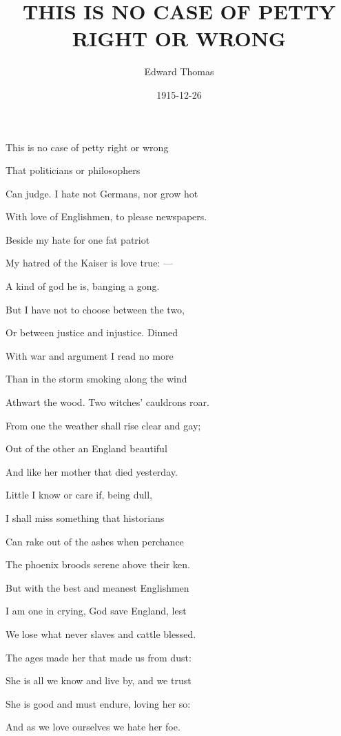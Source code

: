 \documentclass[a4paper]{article}
\title{THIS IS NO CASE OF PETTY RIGHT OR WRONG}
\author{Edward Thomas}
\date{1915-12-26}
\begin{document}
\maketitle


This is no case of petty right or wrong  

That politicians or philosophers 

Can judge.  I hate not Germans, nor grow hot 

With love of Englishmen, to please newspapers.  

Beside my hate for one fat patriot  

My hatred of the Kaiser is love true: ---

A kind of god he is, banging a gong. 

But I have not to choose between the two, 

Or between justice and injustice. Dinned  

With war and argument I read no more  

Than in the storm smoking along the wind 

Athwart the wood. Two witches' cauldrons roar.

From one the weather shall rise clear and gay;

Out of the other an England beautiful  

And like her mother that died yesterday.  

Little I know or care if, being dull,  

I shall miss something that historians  

Can rake out of the ashes when perchance

The phoenix broods serene above their ken.  

But with the best and meanest Englishmen  

I am one in crying, God save England, lest 

We lose what never slaves and cattle blessed.

The ages made her that made us from dust:  

She is all we know and live by, and we trust 

She is good and must endure, loving her so:

And as we love ourselves we hate her foe.
\end{document}
